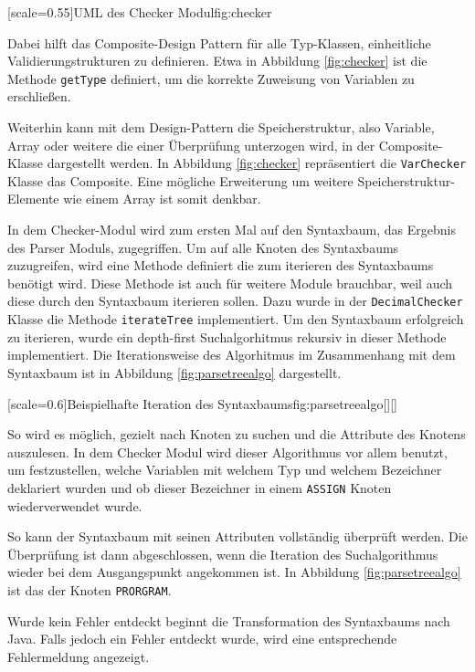 [scale=0.55]{UML des Checker Modul}{fig:checker}

Dabei hilft das Composite-Design Pattern für alle Typ-Klassen, einheitliche Validierungstrukturen zu definieren.
Etwa in Abbildung \ref{fig:checker} ist die Methode \verb+getType+ definiert, um die korrekte Zuweisung von Variablen zu erschließen. 

Weiterhin kann mit dem Design-Pattern die Speicherstruktur, also Variable, Array oder weitere die einer Überprüfung unterzogen wird, in der Composite-Klasse dargestellt werden.
In Abbildung \ref{fig:checker} repräsentiert die \verb+VarChecker+ Klasse das Composite.
Eine mögliche Erweiterung um weitere Speicherstruktur-Elemente wie einem Array ist somit denkbar.

In dem Checker-Modul wird zum ersten Mal auf den Syntaxbaum, das Ergebnis des Parser Moduls, zugegriffen.
Um auf alle Knoten des Syntaxbaums zuzugreifen, wird eine Methode definiert die zum iterieren des Syntaxbaums benötigt wird.
Diese Methode ist auch für weitere Module brauchbar, weil auch diese durch den Syntaxbaum iterieren sollen.
Dazu wurde in der \verb+DecimalChecker+ Klasse die Methode \verb+iterateTree+ implementiert.
Um den Syntaxbaum erfolgreich zu iterieren, wurde ein depth-first Suchalgorhitmus rekursiv in dieser Methode implementiert.
Die Iterationsweise des Algorhitmus im Zusammenhang mit dem Syntaxbaum ist in Abbildung \ref{fig:parsetreealgo} dargestellt.

[scale=0.6]{Beispielhafte Iteration des Syntaxbaums}{fig:parsetreealgo}[][]

So wird es möglich, gezielt nach Knoten zu suchen und die Attribute des Knotens auszulesen.
In dem Checker Modul wird dieser Algorithmus vor allem benutzt, um festzustellen, welche Variablen mit welchem Typ und welchem Bezeichner deklariert wurden und ob dieser Bezeichner in einem \verb+ASSIGN+ Knoten wiederverwendet wurde.

So kann der Syntaxbaum mit seinen Attributen vollständig überprüft werden.
Die Überprüfung ist dann abgeschlossen, wenn die Iteration des Suchalgorithmus wieder bei dem Ausgangspunkt angekommen ist. In Abbildung \ref{fig:parsetreealgo} ist das der Knoten \verb+PRORGRAM+.

Wurde kein Fehler entdeckt beginnt die Transformation des Syntaxbaums nach Java. Falls jedoch ein Fehler entdeckt wurde, wird eine entsprechende Fehlermeldung angezeigt.

